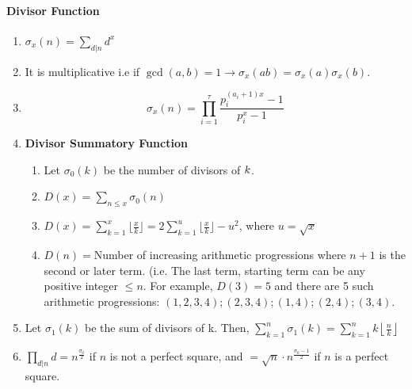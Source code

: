 \paragraph{Divisor Function}\begin{enumerate}

            
            \item $\displaystyle \sigma_x(n)=\sum\limits_{d\vert n}^{}d^x$
            \item It is multiplicative i.e if $\displaystyle \gcd(a, b)=1\to \sigma_x(ab)=\sigma_x(a)\sigma_x(b)$.
            \item 
                \[\displaystyle \sigma_x(n)=\prod\limits_{i=1}^{\tau}\frac{p_i^{(a_i+1)x}-1}{p_i^x-1}\]
            
            \item \textbf{Divisor Summatory Function}
                \begin{enumerate}

                    \item Let $\displaystyle \sigma_0(k)$ be the number of divisors of $\displaystyle \displaystyle k$.
                    
                    \item $D(x)=\sum\limits_{n\leq{x}}{\sigma_0(n)}$
                    \item $D(x)=\sum\limits_{k=1}^{x}\lfloor\frac{x}{k}\rfloor=2\sum\limits_{k=1}^{u}\lfloor\frac{x}{k}\rfloor-u^2$,
                        where $u=\sqrt{x}$
                    \item $D(n)=$Number of increasing arithmetic progressions where $n+1$ is the second or later term.
                        (i.e.
                        The
                        last term, starting term can be any positive integer $\displaystyle \le n$. For example,
                        $D(3)=5$
                        and
                        there are 5 such arithmetic progressions: $\displaystyle (1, 2, 3, 4); (2, 3, 4); (1, 4); (2,
                        4);
                        (3,
                        4).$
                \end{enumerate}

            
            \item Let $\displaystyle \sigma_1(k)$ be the sum of divisors of k. Then, $\displaystyle
                \sum\limits_{k=1}^{n}\sigma_1(k)=\sum\limits_{k=1}^{n}{k \left\lfloor \frac{n}{k} \right\rfloor}$
            \item $\displaystyle \prod\limits_{d\vert n}^{}d={n^{\frac{\sigma_0}{2}}}$ if $n$ is not a perfect square, and
                $=\sqrt{n} \cdot n^{\frac{\sigma_0-1}{2}}$ if $n $ is a perfect square.
                \end{enumerate}
